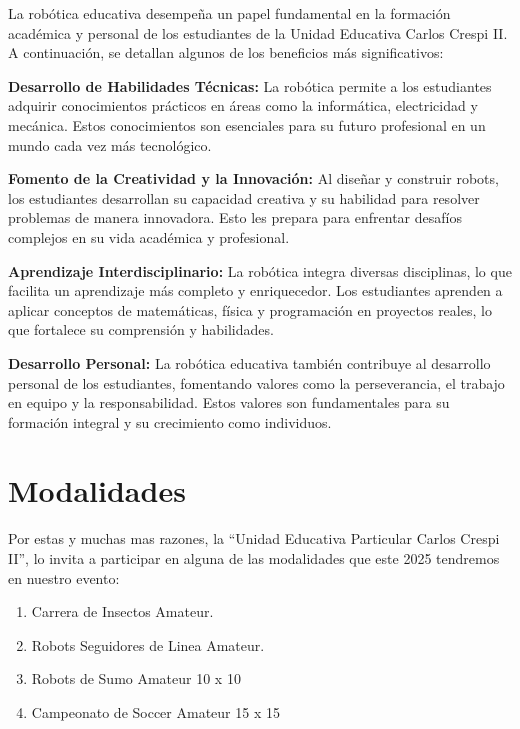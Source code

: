 \documentclass[
  letterpaper,
  DIV=11,
  numbers=noendperiod]{scrreprt}
\begin{document}

La robótica educativa desempeña un papel fundamental en la formación
académica y personal de los estudiantes de la Unidad Educativa Carlos
Crespi II. A continuación, se detallan algunos de los beneficios más
significativos:

\textbf{Desarrollo de Habilidades Técnicas:} La robótica permite a los
estudiantes adquirir conocimientos prácticos en áreas como la
informática, electricidad y mecánica. Estos conocimientos son esenciales
para su futuro profesional en un mundo cada vez más tecnológico.

\textbf{Fomento de la Creatividad y la Innovación:} Al diseñar y
construir robots, los estudiantes desarrollan su capacidad creativa y su
habilidad para resolver problemas de manera innovadora. Esto les prepara
para enfrentar desafíos complejos en su vida académica y profesional.

\textbf{Aprendizaje Interdisciplinario:} La robótica integra diversas
disciplinas, lo que facilita un aprendizaje más completo y enriquecedor.
Los estudiantes aprenden a aplicar conceptos de matemáticas, física y
programación en proyectos reales, lo que fortalece su comprensión y
habilidades.

\textbf{Desarrollo Personal:} La robótica educativa también contribuye
al desarrollo personal de los estudiantes, fomentando valores como la
perseverancia, el trabajo en equipo y la responsabilidad. Estos valores
son fundamentales para su formación integral y su crecimiento como
individuos.

\section*{Modalidades}\label{modalidades}


Por estas y muchas mas razones, la ``Unidad Educativa Particular Carlos
Crespi II'', lo invita a participar en alguna de las modalidades que
este 2025 tendremos en nuestro evento:

\begin{enumerate}
\def\labelenumi{\arabic{enumi}.}
\item
  Carrera de Insectos Amateur.
\item
  Robots Seguidores de Linea Amateur.
\item
  Robots de Sumo Amateur 10 x 10
\item
  Campeonato de Soccer Amateur 15 x 15
\end{enumerate}
\end{document}
